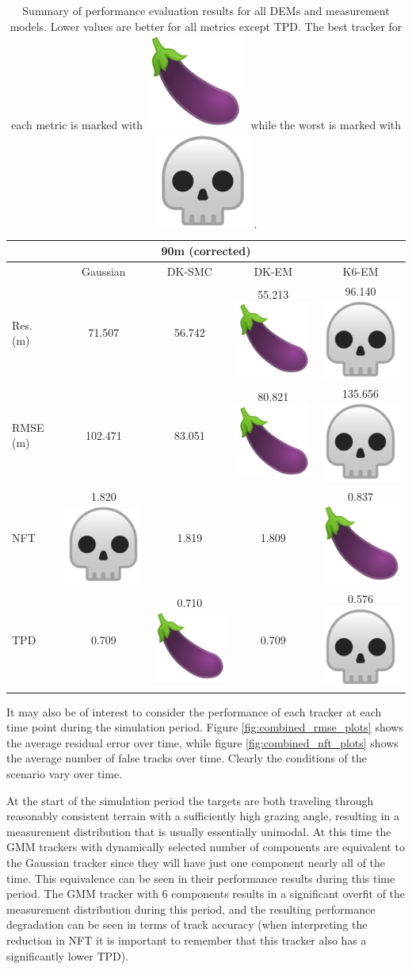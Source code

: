 \documentclass[journal]{IEEEtran}
\DeclareRobustCommand{\eggplant}{%
  \begingroup\normalfont
  \includegraphics[height=\fontcharht\font`\B]{eggplant_1f346.png}%
  \endgroup
}
\DeclareRobustCommand{\skull}{%
  \begingroup\normalfont
  \includegraphics[height=\fontcharht\font`\B]{skull_1f480.png}%
  \endgroup
}
\begin{document}
\begin{table}[ht]
\begin{center}
\begin{tabular}{ |l|c|c|c|c| }
 \hline
 \multicolumn{5}{|c|}{90m (corrected)} \\
 \hline
  & Gaussian & DK-SMC & DK-EM & K6-EM \\
 \hline
 Res. (m) & 71.507 & {\color{green}56.742} & {\color{green}55.213}\eggplant & {\color{red}96.140}\skull \\
 RMSE (m) & 102.471 & {\color{green}83.051} & {\color{green}80.821}\eggplant & {\color{red}135.656}\skull \\
 NFT & 1.820\skull & {\color{green}1.819} & {\color{green}1.809} & {\color{green}0.837}\eggplant \\
 TPD & 0.709 & {\color{green}0.710}\eggplant & 0.709 & {\color{red}0.576}\skull \\
 \hline
 
 \hline
\end{tabular}
\end{center}
\caption{Summary of performance evaluation results for all DEMs and measurement models. Lower values are better for all metrics except TPD. The best tracker for each metric is marked with \eggplant\ while the worst is marked with \skull.}
\label{tab:perfeval_summary}
\end{table}

It may also be of interest to consider the performance of each tracker at each time point during the simulation period. Figure \ref{fig:combined_rmse_plots} shows the average residual error over time, while figure \ref{fig:combined_nft_plots} shows the average number of false tracks over time. Clearly the conditions of the scenario vary over time.

At the start of the simulation period the targets are both traveling through reasonably consistent terrain with a sufficiently high grazing angle, resulting in a measurement distribution that is usually essentially unimodal. At this time the GMM trackers with dynamically selected number of components are equivalent to the Gaussian tracker since they will have just one component nearly all of the time. This equivalence can be seen in their performance results during this time period. The GMM tracker with 6 components results in a significant overfit of the measurement distribution during this period, and the resulting performance degradation can be seen in terms of track accuracy (when interpreting the reduction in NFT it is important to remember that this tracker also has a significantly lower TPD).
\end{document}
